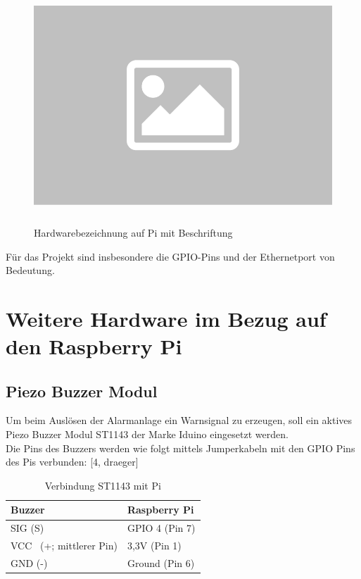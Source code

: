 \documentclass[12pt,a4paper,openany]{scrbook}
\begin{document}
	\begin{figure}[!h]
		\centering
		\includegraphics[height=250pt]{img/platzhalter}
		\caption{Hardwarebezeichnung auf Pi mit Beschriftung}
		\label{Bildlabel}
	\end{figure}
Für das Projekt sind insbesondere die GPIO-Pins und der Ethernetport von Bedeutung.\\

  

\section{Weitere Hardware im Bezug auf den Raspberry Pi}
\subsection{Piezo Buzzer Modul}
	Um beim Auslösen der Alarmanlage ein Warnsignal zu erzeugen, soll ein aktives Piezo Buzzer Modul ST1143 der Marke Iduino eingesetzt werden.\\ Die Pins des Buzzers werden wie folgt mittels Jumperkabeln mit den GPIO Pins des Pis verbunden: [4, draeger]
	
	\begin{table}[!h]
		\centering
		\begin{tabular}{|p{5cm}|p{5cm}|} 
			\hline
			Buzzer & Raspberry Pi  \\ 
			\hline
			SIG (S)   & GPIO 4 \hspace{0,1cm}(Pin 7)\\  
			\hline
			VCC~ (+; mittlerer Pin)   & 3,3V 	\hspace{0,7cm}(Pin 1)         \\ 
			\hline
			GND (-)    & Ground  	\hspace{0,2cm}(Pin 6)         \\
			\hline
		\end{tabular}
	\caption{Verbindung ST1143 mit Pi}
	\end{table} 
\end{document}
